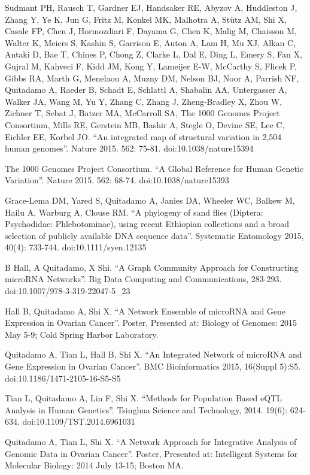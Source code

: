 \documentclass[margin,line]{res}
\begin{document}
\begin{resume}
Sudmant PH, Rausch T, Gardner EJ, Handsaker RE, Abyzov A, Huddleston J, Zhang Y, Ye K, Jun G, Fritz M, Konkel MK, Malhotra A, Stütz AM, Shi X, Casale FP, Chen J, Hormozdiari F, Dayama G, Chen K, Malig M, Chaisson M, Walter K, Meiers S, Kashin S, Garrison E, Auton A, Lam H, Mu XJ, Alkan C, Antaki D, Bae T, Chines P, Chong Z, Clarke L, Dal E, Ding L, Emery S, Fan X, Gujral M, Kahveci F, Kidd JM, Kong Y, Lameijer E-W, McCarthy S, Flicek P, Gibbs RA, Marth G, Menelaou A, Muzny DM, Nelson BJ, Noor A, Parrish NF, Quitadamo A, Raeder B, Schadt E, Schlattl A, Shabalin AA, Untergasser A, Walker JA, Wang M, Yu Y, Zhang C, Zhang J, Zheng-Bradley X, Zhou W, Zichner T, Sebat J, Batzer MA, McCarroll SA, The 1000 Genomes Project Consortium, Mills RE, Gerstein MB, Bashir A, Stegle O, Devine SE, Lee C, Eichler EE, Korbel JO. ``An integrated map of structural variation in 2,504 human genomes''. Nature 2015. 562: 75-81. doi:10.1038/nature15394

The 1000 Genomes Project Consortium. ``A Global Reference for Human Genetic Variation''. Nature 2015. 562: 68-74. doi:10.1038/nature15393

Grace-Lema DM, Yared S, Quitadamo A, Janies DA, Wheeler WC, Balkew M, Hailu A, Warburg A, Clouse RM. ``A phylogeny of sand flies (Diptera: Psychodidae: Phlebotominae), using recent Ethiopian collections and a broad selection of publicly available DNA sequence data''. Systematic Entomology 2015, 40(4): 733-744. doi:10.1111/syen.12135

B Hall, A Quitadamo, X Shi. ``A Graph Community Approach for Constructing microRNA Networks''. Big Data Computing and Communications, 283-293. doi:10.1007/978-3-319-22047-5\_23


Hall B, Quitadamo A, Shi X. ``A Network Ensemble of microRNA and Gene Expression in Ovarian Cancer''. Poster, Presented at: Biology of Genomes: 2015 May 5-9; Cold Spring Harbor Laboratory. 

Quitadamo A, Tian L, Hall B, Shi X. ``An Integrated Network of microRNA and Gene Expression in Ovarian Cancer''. BMC Bioinformatics 2015, 16(Suppl 5):S5. doi:10.1186/1471-2105-16-S5-S5

Tian L, Quitadamo A, Lin F, Shi X. ``Methods for Population Based eQTL Analysis in Human Genetics''. Tsinghua Science and Technology, 2014. 19(6): 624-634. doi:10.1109/TST.2014.6961031

Quitadamo A, Tian L, Shi X. ``A Network Approach for Integrative Analysis of Genomic Data in Ovarian Cancer''. Poster, Presented at: Intelligent Systems for Molecular Biology: 2014 July 13-15; Boston MA.


\end{resume}
\end{document}
